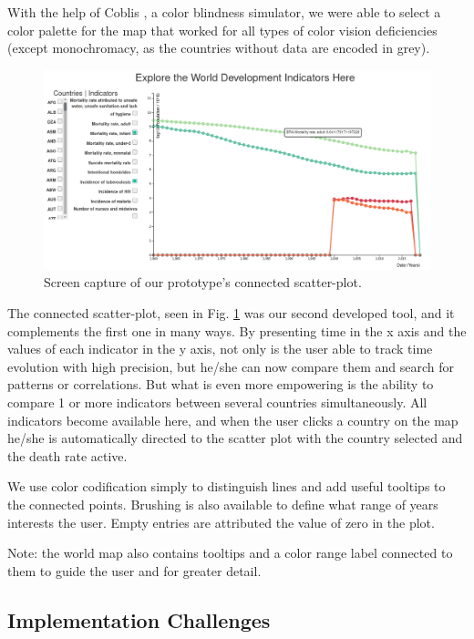 \documentclass[conference]{IEEEtran}
\begin{document}
With the help of Coblis \cite{coblis}, a color blindness simulator, we were able 
to select a color palette for the map that worked for all types of color vision 
deficiencies (except monochromacy, as the countries without data are encoded in grey).

\begin{figure}[h!]
\includegraphics[width=\linewidth]{../img/screenshots/screenshot_connectedscatterplot.png}
\caption{Screen capture of our prototype's connected scatter-plot.}
\label{fig:scatterplot}
\end{figure}

The connected scatter-plot, seen in Fig. \ref{fig:scatterplot} was our second 
developed tool, and it complements the first one in many ways.
By presenting time in the x axis and the values of each indicator in the y axis,
not only is the user able to track time evolution with high precision, but he/she
can now compare them and search for patterns or correlations.
But what is even more empowering is the ability to compare 1 or more indicators
between several countries simultaneously.
All indicators become available here, and when the user clicks a country on the 
map he/she is automatically directed to the scatter plot with the country 
selected and the death rate active.

We use color codification simply to distinguish lines and add useful 
tooltips to the connected points.
Brushing is also available to define what range of years interests the user.
Empty entries are attributed the value of zero in the plot.

Note: the world map also contains tooltips and a color range label connected to 
them to guide the user and for greater detail.

\subsection{Implementation Challenges}
\end{document}
